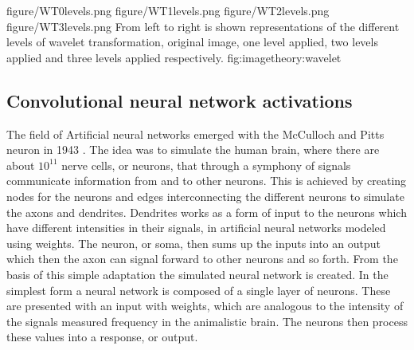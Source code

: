 \fourfigure
{figure/WT0levels.png}
{figure/WT1levels.png}
{figure/WT2levels.png}
{figure/WT3levels.png}
{From left to right is shown representations of the different levels of wavelet transformation, original image, one level applied, two levels applied and three levels applied respectively.}
{fig:imagetheory:wavelet} 




\subsection{Convolutional neural network activations}
\label{sec:vgg_feature}

The field of Artificial neural networks emerged with the McCulloch and Pitts neuron in 1943 \cite{mcculloch1943logical}. The idea was to simulate the human brain, where there are about $10^{11}$ nerve cells, or neurons, that through a symphony of signals communicate information from and to other neurons. This is achieved by creating nodes for the neurons and edges interconnecting the different neurons to simulate the axons and dendrites. Dendrites works as a form of input to the neurons which have different intensities in their signals, in artificial neural networks modeled using weights. The neuron, or soma, then sums up the inputs into an output which then the axon can signal forward to other neurons and so forth. From the basis of this simple adaptation the simulated neural network is created. In the simplest form a neural network is composed of a single layer of neurons. These are presented with an input with weights, which are analogous to the intensity of the signals measured frequency in the animalistic brain. The neurons then process these values into a response, or output.

